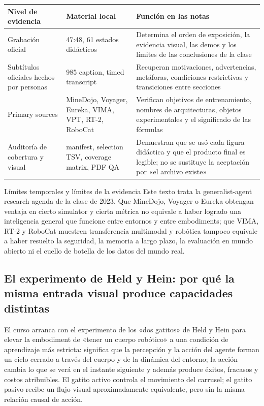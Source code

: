 \documentclass[a4paper]{article}
\begin{document}
\begin{longtable}{@{}L{0.18\textwidth}L{0.31\textwidth}L{0.40\textwidth}@{}}
\toprule
Nivel de evidencia & Material local & Función en las notas \\
\midrule
Grabación oficial & 47:48, 61 estados didácticos & Determina el orden de exposición, la evidencia visual, las demos y los límites de las conclusiones de la clase \\
Subtítulos oficiales hechos por personas & 985 caption, timed transcript & Recuperan motivaciones, advertencias, metáforas, condiciones restrictivas y transiciones entre secciones \\
Primary sources & MineDojo, Voyager, Eureka, VIMA, VPT, RT-2, RoboCat & Verifican objetivos de entrenamiento, nombres de arquitecturas, objetos experimentales y el significado de las fórmulas \\
Auditoría de cobertura y visual & manifest, selection TSV, coverage matrix, PDF QA & Demuestran que se usó cada figura didáctica y que el producto final es legible; no se sustituye la aceptación por «el archivo existe» \\
\bottomrule
\end{longtable}

\begin{warningbox}{Límites temporales y límites de la evidencia}
Este texto trata la generalist-agent research agenda de la clase de 2023. Que MineDojo, Voyager o Eureka obtengan ventaja en cierto simulator y cierta métrica no equivale a haber logrado una inteligencia general que funcione entre entornos y entre embodiments; que VIMA, RT-2 y RoboCat muestren transferencia multimodal y robótica tampoco equivale a haber resuelto la seguridad, la memoria a largo plazo, la evaluación en mundo abierto ni el cuello de botella de los datos del mundo real.
\end{warningbox}

\subsection{El experimento de Held y Hein: por qué la misma entrada visual produce capacidades distintas}

El curso arranca con el experimento de los «dos gatitos» de Held y Hein para elevar la embodiment de «tener un cuerpo robótico» a una condición de aprendizaje más estricta:  significa que la percepción y la acción del agente forman un ciclo cerrado a través del cuerpo y de la dinámica del entorno; la acción cambia lo que se verá en el instante siguiente y además produce éxitos, fracasos y costos atribuibles. El gatito activo controla el movimiento del carrusel; el gatito pasivo recibe un flujo visual aproximadamente equivalente, pero sin la misma relación causal de acción.
\end{document}
